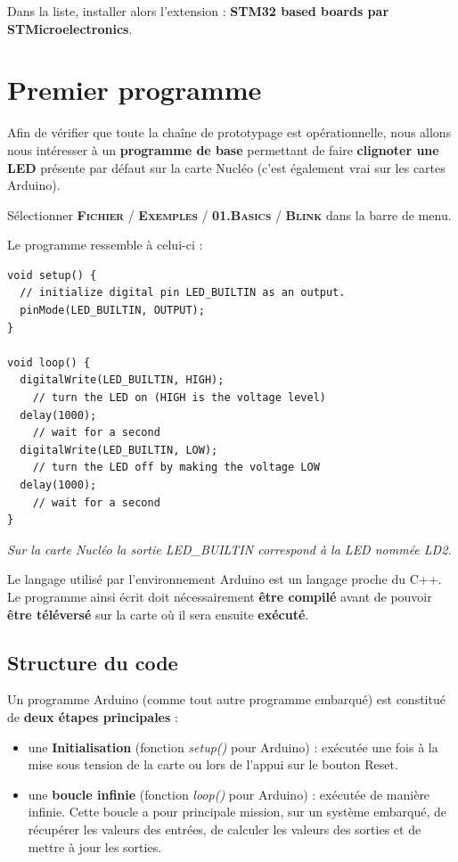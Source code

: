 \documentclass[a4paper,11pt,titlepage]{article} %
\begin{document}
Dans la liste, installer alors l'extension : \textbf{STM32 based boards par STMicroelectronics}.

\newpage
\pagestyle{empty}
\strut
\cleardoublepage
\pagestyle{plain}
\section{Premier programme}

Afin de vérifier que toute la chaîne de prototypage est opérationnelle, nous allons nous intéresser à un \textbf{programme de base} permettant de faire \textbf{clignoter une LED} présente par défaut sur la carte Nucléo (c'est également vrai sur les cartes Arduino).

Sélectionner \textsc{\textbf{Fichier} / \textbf{Exemples} / \textbf{01.Basics} / \textbf{Blink}} dans la barre de menu.

Le programme ressemble à celui-ci :

\begin{lstlisting}
void setup() {
  // initialize digital pin LED_BUILTIN as an output.
  pinMode(LED_BUILTIN, OUTPUT);
}

void loop() {
  digitalWrite(LED_BUILTIN, HIGH);  
  	// turn the LED on (HIGH is the voltage level)
  delay(1000);                      
  	// wait for a second
  digitalWrite(LED_BUILTIN, LOW);   
  	// turn the LED off by making the voltage LOW
  delay(1000);                      
  	// wait for a second
}
\end{lstlisting}

\textit{Sur la carte Nucléo la sortie LED\_BUILTIN correspond à la LED nommée LD2.}

Le langage utilisé par l'environnement Arduino est un langage proche du C++. Le programme ainsi écrit doit nécessairement \textbf{être compilé} avant de pouvoir \textbf{être téléversé} sur la carte où il sera ensuite \textbf{exécuté}.

\subsection{Structure du code}

Un programme Arduino (comme tout autre programme embarqué) est constitué de \textbf{deux étapes principales} : 

\begin{itemize}
	\item une \textbf{Initialisation} (fonction \textsl{setup()} pour Arduino) : exécutée une fois à la mise sous tension de la carte ou lors de l'appui sur le bouton Reset.
	\item une \textbf{boucle infinie} (fonction \textsl{loop()} pour Arduino) : exécutée de manière infinie. Cette boucle a pour principale mission, sur un système embarqué, de récupérer les valeurs des entrées, de calculer les valeurs des sorties et de mettre à jour les sorties.
\end{itemize}
\end{document}
